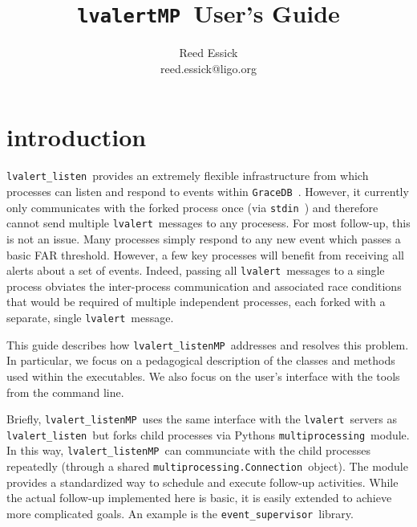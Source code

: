 \documentclass{article}
\newcommand{\stdin}{\texttt{stdin}~}
\newcommand{\multiprocessing}{\texttt{multiprocessing}~}
\newcommand{\multiprocessingConnection}{\texttt{multiprocessing.Connection}~}
\newcommand{\GraceDB}{\texttt{GraceDB}~}
\newcommand{\alert}{\texttt{lvalert}~}
\newcommand{\lvalertListen}{\texttt{lvalert\_listen}~}
\newcommand{\lvalertMP}{\texttt{lvalertMP}~}
\newcommand{\lvalertListenMP}{\texttt{lvalert\_listenMP}~}
\newcommand{\eventSupervisor}{\texttt{event\_supervisor}~}
\begin{document}

\title{
\lvalertMP User's Guide
}

\author{
Reed Essick \\
reed.essick@ligo.org
}

\maketitle

\newpage


\tableofcontents
\listoffigures

\newpage


\section{introduction}

\lvalertListen provides an extremely flexible infrastructure from which processes can listen and respond to events within \GraceDB. 
However, it currently only communicates with the forked process once (via \stdin) and therefore cannot send multiple \alert messages to any procesess.
For most follow-up, this is not an issue.
Many processes simply respond to any new event which passes a basic FAR threshold. 
However, a few key processes will benefit from receiving all alerts about a set of events.
Indeed, passing all \alert messages to a single process obviates the inter-process communication and associated race conditions that would be required of multiple independent processes, each forked with a separate, single \alert message.

This guide describes how \lvalertListenMP addresses and resolves this problem. 
In particular, we focus on a pedagogical description of the classes and methods used within the executables.
We also focus on the user's interface with the tools from the command line.

Briefly, \lvalertListenMP uses the same interface with the \alert servers as \lvalertListen but forks child processes via Pythons \multiprocessing module.
In this way, \lvalertListenMP can communciate with the child processes repeatedly (through a shared \multiprocessingConnection object).
The module provides a standardized way to schedule and execute follow-up activities.
While the actual follow-up implemented here is basic, it is easily extended to achieve more complicated goals.
An example is the \eventSupervisor library.
\end{document}
